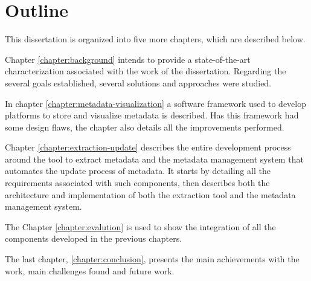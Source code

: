 \section{Outline}
This dissertation is organized into five more chapters, which are described below.

Chapter \ref{chapter:background} intends to provide a state-of-the-art characterization associated with the work of the dissertation.
Regarding the several goals established, several solutions and approaches were studied.

In chapter \ref{chapter:metadata-visualization} a software framework used to develop platforms to store and visualize metadata is described.
Has this framework had some design flaws, the chapter also details all the improvements performed.

Chapter \ref{chapter:extraction-update} describes the entire development process around the tool to extract metadata and the metadata management system that automates the update process of metadata.
It starts by detailing all the requirements associated with such components, then describes both the architecture and implementation of both the extraction tool and the metadata management system.

The Chapter \ref{chapter:evalution} is used to show the integration of all the components developed in the previous chapters.

The last chapter, \ref{chapter:conclusion}, presents the main achievements with the work, main challenges found and future work.
